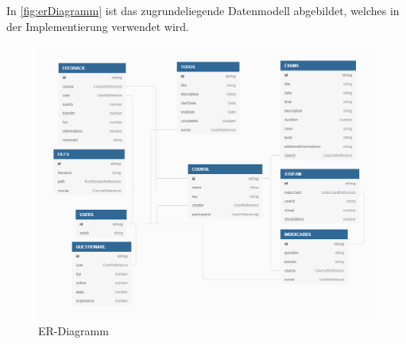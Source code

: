 In \autoref{fig:erDiagramm} ist das zugrundeliegende Datenmodell abgebildet, welches in der Implementierung verwendet wird.

\begin{figure}[ht!] %
    \begin{center}
        \includegraphics[width=\textwidth]{img/Integrationsseminar ER.png}
        \caption{ER-Diagramm}
        \label{fig:erDiagramm}
    \end{center}
\end{figure}





